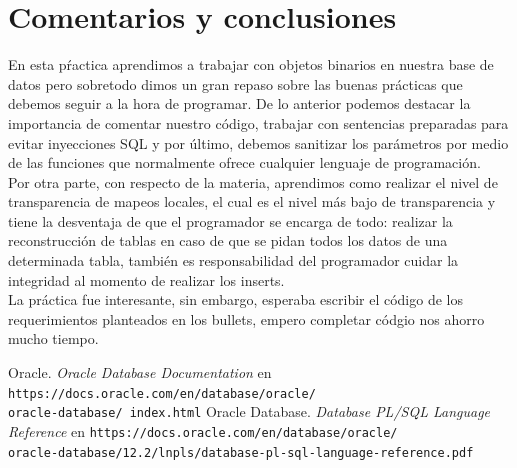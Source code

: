 \documentclass{article}
\begin{document}
\section*{Comentarios y conclusiones}

En esta pŕactica aprendimos a trabajar con objetos binarios en nuestra base
de datos pero sobretodo dimos un gran repaso sobre las buenas prácticas
que debemos seguir a la hora de programar. De lo anterior podemos destacar la
importancia de comentar nuestro código, trabajar con sentencias preparadas
para evitar inyecciones SQL y por último, debemos sanitizar los parámetros
por medio de las funciones que normalmente ofrece cualquier lenguaje de
programación.\\

Por otra parte, con respecto de la materia, aprendimos como realizar el
nivel de transparencia de mapeos locales, el cual es el nivel más bajo de 
transparencia y tiene la desventaja de que el programador se encarga de todo:
realizar la reconstrucción de tablas en caso de que se pidan todos los 
datos de una determinada tabla, también es responsabilidad del programador 
cuidar la integridad al momento de realizar los inserts.\\

La práctica fue interesante, sin embargo, esperaba escribir el código de los
requerimientos planteados en los bullets, empero completar códgio nos ahorro
mucho tiempo.

\renewcommand\refname{Bibliografía}
\begin{thebibliography}{99}
     Oracle. \textit{Oracle Database Documentation} en 
        \texttt{https://docs.oracle.com/en/database/oracle/\\oracle-database/%
        index.html}
     Oracle Database. \textit{Database PL/SQL Language 
        Reference} en 
        \texttt{https://docs.oracle.com/en/database/oracle/\\
        oracle-database/12.2/lnpls/database-pl-sql-language-reference.pdf}
\end{thebibliography}
\end{document}
